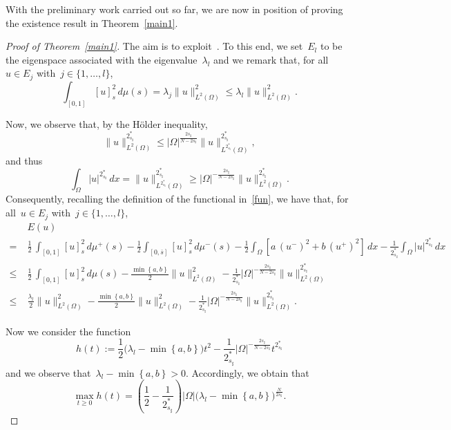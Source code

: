 \documentclass[12pt,a4paper,intlimits,sumlimits]{amsart}
\newcommand{\half}{\frac{1}{2}}
\newcommand{\set}[1]{\left\{#1\right\}}
\theoremstyle{definition}
\theoremstyle{plain}
\numberwithin{equation}{section}
\renewcommand{\le}{\leqslant}
\renewcommand{\ge}{\geqslant}
\begin{document}
With the preliminary work carried out so far, we are now in position of proving the existence
result in Theorem~\ref{main1}.

\begin{proof}[Proof of Theorem~\ref{main1}]
The aim is to exploit~\cite[Theorem 4.1]{MR4535437}. To this end, we set~$E_l$ to be the eigenspace associated with the eigenvalue~$\lambda_l$
and we remark that, for all~$u\in E_j$ with~$j\in\{1,\dots,l\}$,
$$ \int_{[{{ 0 }}, 1]} [u]^2_{s}\, d\mu (s) =\lambda_j \|u\|^2_{L^2(\Omega)}\le \lambda_l \|u\|^2_{L^2(\Omega)}.$$

Now, we observe that, by the H\"older inequality,
\[
\|u\|^{2^*_{s_\sharp}}_{L^2(\Omega)}\le |\Omega|^{\frac{2 s_\sharp}{N-2 s_\sharp}} \|u\|_{L^{2_{s_\sharp}^*}(\Omega)}^{2^*_{s_\sharp}},
\]
and thus
\[ \int_\Omega |u|^{2_{s_\sharp}^*}\, dx =  \|u\|_{L^{2_{s_\sharp}^*}(\Omega)}^{2^*_{s_\sharp}}\ge  |\Omega|^{-\frac{2 s_\sharp}{N-2s_\sharp}} \|u\|^{2^*_{s_\sharp}}_{L^2(\Omega)}.
\]
Consequently, recalling the definition of the functional in~\eqref{fun}, we have that, for all~$u\in E_j$ with~$j\in\{1,\dots,l\}$,
\begin{equation}\label{diywtr843yt9876543}\begin{split}
&E(u)\\
=\;&
\half \,\int_{[{{ 0 }}, 1]} [u]^2_{s}\, d\mu^+ (s)
 -\half\int_{[{{ 0 }}, \overline s]} [u]^2_s\, d\mu^-(s) - \half \int_\Omega \left[a\, (u^-)^2 + b\, (u^+)^2\right]\, dx - \frac{1}{2_{s_\sharp}^*} \int_\Omega |u|^{2_{s_\sharp}^*}\, dx
\\
\le\;&\half \,\int_{[{{ 0 }}, 1]} [u]^2_{s}\, d\mu (s)
- \frac{ \min \set{a,b}}2\|u\|_{L^2(\Omega)}^2 - \frac{1}{2_{s_\sharp}^*} |\Omega|^{-\frac{2 s_\sharp}{N-2s_\sharp}} \|u\|^{2^*_{s_\sharp}}_{L^2(\Omega)}\\
\le\;&\frac{\lambda_l}2 \|u\|^2_{L^2(\Omega)}
- \frac{ \min \set{a,b}}2\|u\|_{L^2(\Omega)}^2 - \frac{1}{2_{s_\sharp}^*} |\Omega|^{-\frac{2 s_\sharp}{N-2s_\sharp}} \|u\|^{2^*_{s_\sharp}}_{L^2(\Omega)}.
\end{split}\end{equation}

Now we consider the function
$$ h(t):=\frac12\big( \lambda_l
- \min \set{a,b}\big)t^2 - \frac{1}{2_{s_\sharp}^*} |\Omega|^{-\frac{2 s_\sharp}{N-2s_\sharp}}t^{2^*_{s_\sharp}} $$
and we observe that~$\lambda_l- \min \set{a,b}>0$. Accordingly, we obtain that
$$ \max_{t\ge0} h(t) =\left(\frac12-\frac1{2_{s_\sharp}^*}\right) |\Omega| \big(\lambda_l
- \min \set{a,b}\big)^{\frac{N}{2s_\sharp}}.$$


\end{proof}
\end{document}

